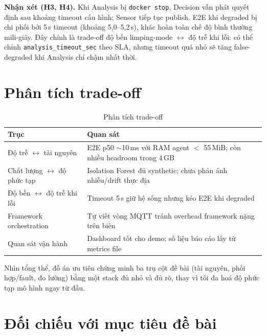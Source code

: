\documentclass[12pt,a4paper,oneside]{report}
\newcommand{\code}[1]{\texttt{#1}}
\begin{document}
\noindent\textbf{Nhận xét (H3, H4).} Khi Analysis bị \code{docker stop}, Decision vẫn phát quyết định sau khoảng timeout cấu hình; Sensor tiếp tục publish. E2E khi degraded bị chi phối bởi 5\,s timeout (khoảng 5,0--5,2\,s), khác hoàn toàn chế độ bình thường mili-giây. Đây chính là trade-off độ bền limping-mode $\leftrightarrow$ độ trễ khi lỗi: có thể chỉnh \code{analysis\_timeout\_sec} theo SLA, nhưng timeout quá nhỏ sẽ tăng false-degraded khi Analysis chỉ chậm nhất thời.

\section{Phân tích trade-off}

\begin{table}[htbp]
  \centering
  \caption{Phân tích trade-off}
  \label{tab:tradeoff}
  \begin{tabular}{p{4.0cm}p{9.0cm}}
    \toprule
    \textbf{Trục} & \textbf{Quan sát} \\
    \midrule
    Độ trễ $\leftrightarrow$ tài nguyên & E2E p50 $\sim$10\,ms với RAM agent $<$ 55\,MiB; còn nhiều headroom trong 4\,GB \\
    Chất lượng $\leftrightarrow$ độ phức tạp & Isolation Forest đủ synthetic; chưa phản ánh nhiễu/drift thực địa \\
    Độ bền $\leftrightarrow$ độ trễ khi lỗi & Timeout 5\,s giữ hệ sống nhưng kéo E2E khi degraded \\
    Framework orchestration & Tự viết vòng MQTT tránh overhead framework nặng trên biên \\
    Quan sát vận hành & Dashboard tốt cho demo; số liệu báo cáo lấy từ metrics file \\
    \bottomrule
  \end{tabular}
\end{table}

Nhìn tổng thể, đồ án ưu tiên chứng minh ba trụ cột đề bài (tài nguyên, phối hợp/fault, đo lường) bằng một stack đủ nhỏ và đủ rõ, thay vì tối đa hoá độ phức tạp mô hình ngay từ đầu.

\section{Đối chiếu với mục tiêu đề bài}
\end{document}
